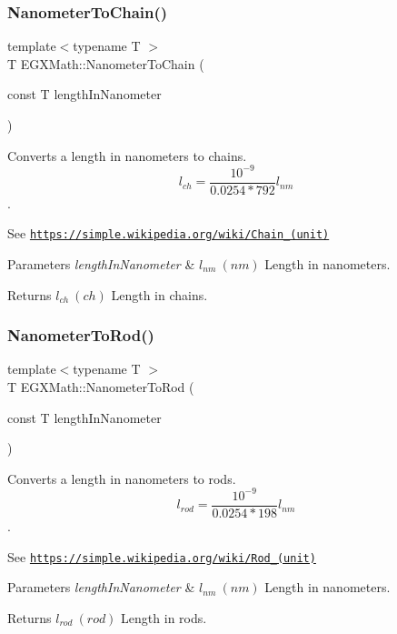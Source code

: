 \subsubsection{\texorpdfstring{Nanometer\+To\+Chain()}{NanometerToChain()}}
{\footnotesize\ttfamily template$<$typename T $>$ \\
T E\+G\+X\+Math\+::\+Nanometer\+To\+Chain (\begin{DoxyParamCaption}\item[{const T}]{length\+In\+Nanometer }\end{DoxyParamCaption})}



Converts a length in nanometers to chains. \[ l_{ch}= \frac{10^{-9}}{0.0254 * 792} l_{nm} \]. 

See \href{https://simple.wikipedia.org/wiki/Chain_(unit)}{\tt https\+://simple.\+wikipedia.\+org/wiki/\+Chain\+\_\+(unit)} 
\begin{DoxyParams}{Parameters}
{\em length\+In\+Nanometer} & $ l_{nm}\ (nm)$ Length in nanometers. \\
\hline
\end{DoxyParams}
\begin{DoxyReturn}{Returns}
$ l_{ch}\ (ch)$ Length in chains. 
\end{DoxyReturn}
\mbox{\label{group___e_g_x_math-_conversions-_length_conversions-_s_i-_nanometer-_surveyors_ga4677e0e0b8662f3786f43cea2f76e8d9}} 
\subsubsection{\texorpdfstring{Nanometer\+To\+Rod()}{NanometerToRod()}}
{\footnotesize\ttfamily template$<$typename T $>$ \\
T E\+G\+X\+Math\+::\+Nanometer\+To\+Rod (\begin{DoxyParamCaption}\item[{const T}]{length\+In\+Nanometer }\end{DoxyParamCaption})}



Converts a length in nanometers to rods. \[ l_{rod}= \frac{10^{-9}}{0.0254 * 198} l_{nm} \]. 

See \href{https://simple.wikipedia.org/wiki/Rod_(unit)}{\tt https\+://simple.\+wikipedia.\+org/wiki/\+Rod\+\_\+(unit)} 
\begin{DoxyParams}{Parameters}
{\em length\+In\+Nanometer} & $ l_{nm}\ (nm)$ Length in nanometers. \\
\hline
\end{DoxyParams}
\begin{DoxyReturn}{Returns}
$ l_{rod}\ (rod)$ Length in rods. 
\end{DoxyReturn}
